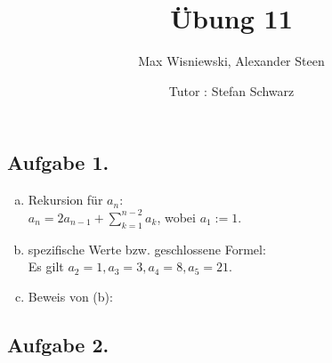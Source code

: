 \documentclass[11pt,a4paper,ngerman]{article}
\date{Tutor : Stefan Schwarz}
\title{Übung 11}
\author{Max Wisniewski, Alexander Steen}
\begin{document}

\renewcommand{\figurename}{Figure}

\maketitle
\thispagestyle{fancy}

\subsection*{Aufgabe 1.}
\begin{enumerate}[a)]
\item Rekursion für $a_n$: \\
$a_n = 2 a_{n-1} + \sum_{k=1}^{n-2} a_k$, wobei $a_1 := 1$.
\item spezifische Werte bzw. geschlossene Formel: \\
Es gilt $a_2 = 1, a_3 = 3, a_4 = 8, a_5 = 21$.
\item Beweis von (b): \\
\end{enumerate}

\subsection*{Aufgabe 2.}
\end{document}
